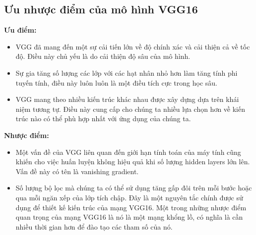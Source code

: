 \subsection{Ưu nhược điểm của mô hình VGG16}
\textbf{Ưu điểm:}
\begin{itemize}
	\item VGG đã mang đến một sự cải tiến lớn về độ chính xác và cải thiện cả về tốc độ. Điều này chủ yếu là do cải thiện độ sâu của mô hình.
	\item Sự gia tăng số lượng các lớp với các hạt nhân nhỏ hơn làm tăng tính phi tuyến tính, điều này luôn luôn là một điều tích cực trong học sâu.
	\item VGG mang theo nhiều kiến trúc khác nhau được xây dựng dựa trên khái niệm tương tự. Điều này cung cấp cho chúng ta nhiều lựa chọn hơn về kiến trúc nào có thể phù hợp nhất với ứng dụng của chúng ta.
\end{itemize}
\textbf{Nhược điểm:}
\begin{itemize}
	\item Một vấn đề của VGG liên quan đến giới hạn tính toán của máy tính cũng khiến cho việc huấn luyện không hiệu quả khi số lượng hidden layers lớn lên. Vấn đề này có tên là vanishing gradient.
	\item Số lượng bộ lọc mà chúng ta có thể sử dụng tăng gấp đôi trên mỗi bước hoặc qua mỗi ngăn xếp của lớp tích chập. Đây là một nguyên tắc chính được sử dụng để thiết kế kiến trúc của mạng VGG16. Một trong những nhược điểm quan trọng của mạng VGG16 là nó là một mạng khổng lồ, có nghĩa là cần nhiều thời gian hơn để đào tạo các tham số của nó.
\end{itemize}
